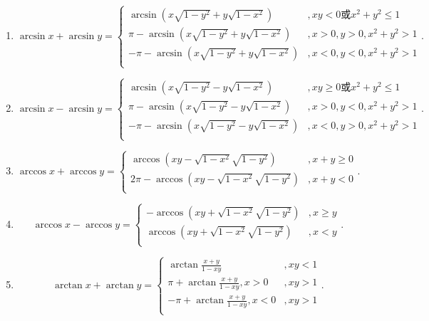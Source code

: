 \documentclass[../../main.tex]{subfiles}
\begin{document}
\begin{theorem}[常用反三角函数性质]\label{theorem:常用反三角函数性质}
\begin{enumerate}
\item $$\arcsin x+\arcsin y=\begin{cases}
\arcsin \left( x\sqrt{1-y^2}+y\sqrt{1-x^2} \right) &,xy<0\text{或}x^2+y^2\leqslant 1\\
\pi -\arcsin \left( x\sqrt{1-y^2}+y\sqrt{1-x^2} \right) &,x>0,y>0,x^2+y^2>1\\
-\pi -\arcsin \left( x\sqrt{1-y^2}+y\sqrt{1-x^2} \right) &,x<0,y<0,x^2+y^2>1\\
\end{cases}.$$

\item $$\arcsin x-\arcsin y=\begin{cases}
\arcsin \left( x\sqrt{1-y^2}-y\sqrt{1-x^2} \right) &,xy\geqslant 0\text{或}x^2+y^2\leqslant 1\\
\pi -\arcsin \left( x\sqrt{1-y^2}-y\sqrt{1-x^2} \right) &,x>0,y<0,x^2+y^2>1\\
-\pi -\arcsin \left( x\sqrt{1-y^2}-y\sqrt{1-x^2} \right) &,x<0,y>0,x^2+y^2>1\\
\end{cases}.$$

\item $$\arccos x+\arccos y=\begin{cases}
\arccos \left( xy-\sqrt{1-x^2}\sqrt{1-y^2} \right) &,x+y\geqslant 0\\
2\pi -\arccos \left( xy-\sqrt{1-x^2}\sqrt{1-y^2} \right) &,x+y<0\\
\end{cases}.$$

\item $$\arccos x-\arccos y=\begin{cases}
-\arccos \left( xy+\sqrt{1-x^2}\sqrt{1-y^2} \right) &,x\geqslant y\\
\arccos \left( xy+\sqrt{1-x^2}\sqrt{1-y^2} \right) &,x<y\\
\end{cases}.$$

\item $$\arctan x+\arctan y=\begin{cases}
\arctan \frac{x+y}{1-xy}&,xy<1\\
\pi +\arctan \frac{x+y}{1-xy},x>0&,xy>1\\
-\pi +\arctan \frac{x+y}{1-xy},x<0&,xy>1\\
\end{cases}.$$


\end{enumerate}
\end{theorem}
\end{document}
